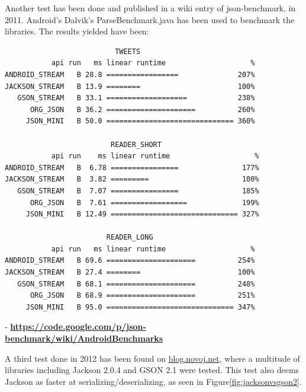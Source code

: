 \begin{enumerate}
  Another test has been done and published in a wiki entry of json-benchmark,
  in 2011. Android's Dalvik's ParseBenchmark.java has been used to benchmark
  the libraries. The results yielded have been:\newline
  \begin{verbatim}
                          TWEETS                              
           api run   ms linear runtime                    % 
ANDROID_STREAM   B 28.8 =================              207% 
JACKSON_STREAM   B 13.9 ========                       100% 
   GSON_STREAM   B 33.1 ===================            238% 
      ORG_JSON   B 36.2 =====================          260% 
     JSON_MINI   B 50.0 ============================== 360% 

                         READER_SHORT                        
           api run    ms linear runtime                    % 
ANDROID_STREAM   B  6.78 ================               177% 
JACKSON_STREAM   B  3.82 =========                      100% 
   GSON_STREAM   B  7.07 ================               185% 
      ORG_JSON   B  7.61 ==================             199% 
     JSON_MINI   B 12.49 ============================== 327% 

                        READER_LONG                         
           api run   ms linear runtime                    % 
ANDROID_STREAM   B 69.6 =====================          254% 
JACKSON_STREAM   B 27.4 ========                       100% 
   GSON_STREAM   B 68.1 =====================          248% 
      ORG_JSON   B 68.9 =====================          251% 
     JSON_MINI   B 95.0 ============================== 347% 
  \end{verbatim}  -
  \textbf{\url{https://code.google.com/p/json-benchmark/wiki/AndroidBenchmarks}}\newline
   
  A third test done in 2012 has been found on \url{blog.novoj.net}, where a
  multitude of libraries including Jackson 2.0.4 and GSON 2.1 were tested. This
  test also deems Jackson as faster at serializing/deserializing, as seen in
  Figure\ref{fig:jacksonvsgson2}.\newline
  

\end{enumerate}
